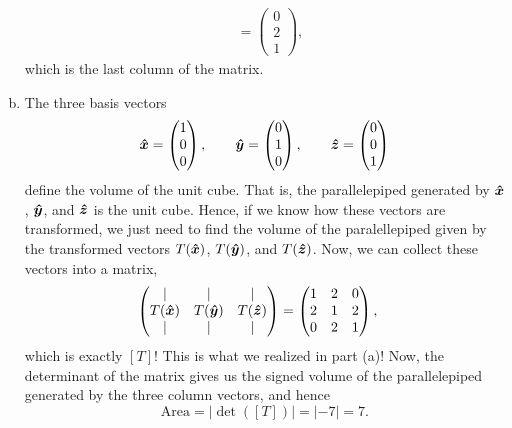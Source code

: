 \documentclass[12pt]{article} %
\begin{document}
\begin{solution}
\begin{enumerate}[(a)]
\begin{align*}
&= \begin{pmatrix} 0 \\ 2 \\ 1 \end{pmatrix},
    \end{align*}
    which is the last column of the matrix.
    \item The three basis vectors 
    \[
    \boldsymbol{\hat{x}} = \begin{pmatrix} 1 \\ 0 \\ 0 \end{pmatrix}, \qquad \boldsymbol{\hat{y}} = \begin{pmatrix} 0 \\ 1 \\ 0 \end{pmatrix}, \qquad \boldsymbol{\hat{z}} =\begin{pmatrix} 0 \\ 0 \\ 1 \end{pmatrix}
    \]
    define the volume of the unit cube. That is, the parallelepiped generated by $\boldsymbol{\hat{x}}$, $\boldsymbol{\hat{y}}$, and $\boldsymbol{\hat{z}}$ is the unit cube. Hence, if we know how these vectors are transformed, we just need to find the volume of the paralellepiped given by the transformed vectors $T(\boldsymbol{\hat{x}})$, $T(\boldsymbol{\hat{y}})$, and $T(\boldsymbol{\hat{z}})$.  Now, we can collect these vectors into a matrix,
    \begin{align*}
    \begin{pmatrix} \vert & \vert & \vert \\ T(\boldsymbol{\hat{x}}) & T(\boldsymbol{\hat{y}}) & T(\boldsymbol{\hat{z}}) \\ \vert & \vert & \vert \end{pmatrix} &= \begin{pmatrix}  1& 2& 0\\
2& 1& 2\\
0& 2& 1\end{pmatrix},
    \end{align*}
    which is exactly $[T]$! This is what we realized in part (a)! Now, the determinant of the matrix gives us the signed volume of the parallelepiped generated by the three column vectors, and hence
    \[
    \mathrm{Area}=|\det([T])|=|-7|=7.
    \]
\end{enumerate}
\end{solution}
\end{document}
